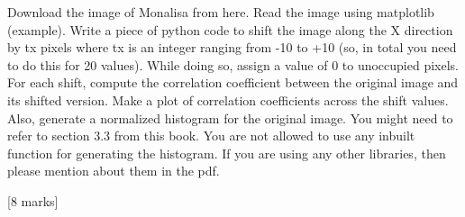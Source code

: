 \begin{que}
	Download the image of Monalisa from here. Read the image using matplotlib (example). Write a
	piece of python code to shift the image along the X direction by tx pixels where tx is an integer
	ranging from -10 to +10 (so, in total you need to do this for 20 values). While doing so, assign
	a value of 0 to unoccupied pixels. For each shift, compute the correlation coefficient between the
	original image and its shifted version. Make a plot of correlation coefficients across the shift values.
	Also, generate a normalized histogram for the original image. You might need to refer to section
	3.3 from this book. You are not allowed to use any inbuilt function for generating the histogram.
	If you are using any other libraries, then please mention about them in the pdf.

	\hspace*{\fill} [8 marks]
\end{que}

